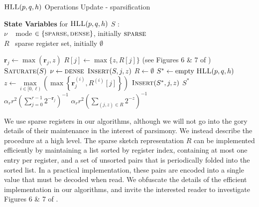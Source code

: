 \documentclass[10]{article}
\newcommand{\algoname}[1]{\textnormal{\textsc{#1}}}
\begin{document}
\begin{algorithm}[htbp] 
\caption{$\algoname{HLL}(p,q,h)$ Operations  Update - sparsification}\label{alg:hll:sparse}
\begin{flushleft}
        \textbf{State Variables} for $\algoname{HLL}(p, q, h)$ $S$ :		\\
    		\hspace{2.65em}	$\nu$  \,\,\, mode $\in \{\algoname{sparse}, \algoname{dense}\}$, initially $\algoname{sparse}$ \\
    		\hspace{2.65em}	$R$  \, sparse register set, initially $\emptyset$
\end{flushleft}
\begin{algorithmic}[1]
		\If {$\nu = \algoname{dense}$}
			\State $\mathbf{r}_j \gets \max ( \mathbf{r}_j, z)$
		\ElsIf {$\nu = \algoname{sparse}$}
			\State $R[j] \gets \max \{z, R[j]\}$ (see Figures 6 \& 7 of \cite{heule2013hyperloglog})
				\State $\algoname{Saturate}(S)$
			\EndIf
		\EndIf
	\EndFunction
%
		\State $\nu \gets \algoname{dense}$
			\State $\algoname{Insert}(S, j, z)$
		\EndFor
		\State $R \gets \emptyset$
	\EndFunction
%
		\State $S^* \gets \text{empty $\algoname{HLL}(p, q, h)$}$
		\For{$j \in [0,r)$} 
			\State $z \gets  \max\limits_{ i \in [0, \ell)} \left ( \max \left \{ \mathbf{r}^{(i)}_j, R^{(i)}[j] \right \} \right )$
				\State $\algoname{Insert}(S^*, j, z)$
			\EndIf
		\EndFor
		\State \Return $S^*$
	\EndFunction
%
		\If{$\nu = \algoname{dense}$}
			\State \Return $\alpha_r r^2 \left ( \sum\limits_{j=0}^{r-1} 2^{-\mathbf{r}_j} \right) ^{-1}$
		\Else
			\State \Return $\alpha_r r^2 \left ( \sum\limits_{(j, z) \in R} 2^{-z} \right) ^{-1}$
		\EndIf
	\EndFunction
\end{algorithmic}
\end{algorithm}


We use sparse registers in our algorithms, although we will not go into the gory details of their maintenance in the interest of parsimony.
We instead describe the procedure at a high level.
The sparse sketch representation $R$ can be implemented efficiently by maintaining a list sorted by register index, containing at most one entry per register, and a set of unsorted pairs that is periodically folded into the sorted list.
In a practical implementation, these pairs are encoded into a single value that must be decoded when read.
We obfuscate the details of the efficient implementation in our algorithms, and invite the interested reader to investigate Figures 6 \& 7 of \cite{heule2013hyperloglog}.
\end{document}

